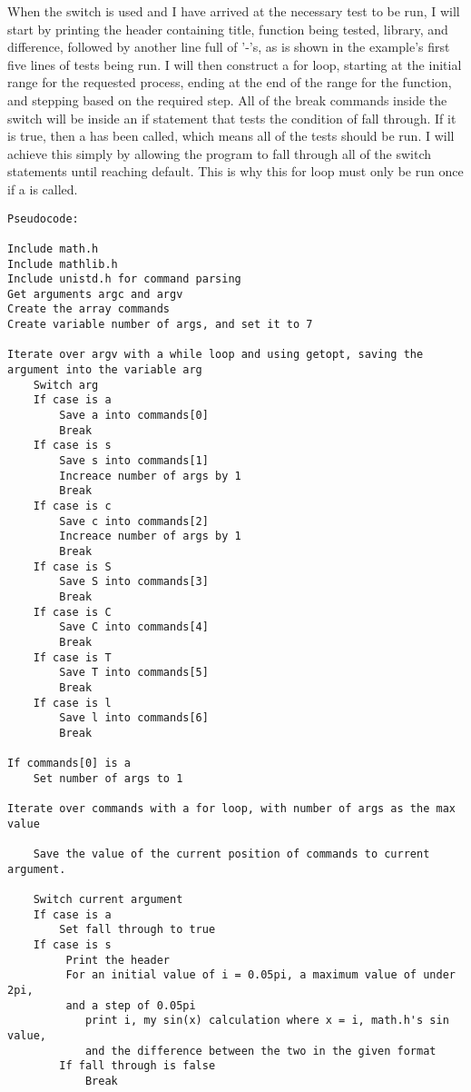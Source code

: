 \documentclass[11pt]{article}
\begin{document}
When the switch is used and I have arrived at the necessary test to be run, I will start by printing the header containing title, function being tested, library, and difference, followed by another line full of '-'s, as is shown in the example’s first five lines of tests being run. I will then construct a for loop, starting at the initial range for the requested process, ending at the end of the range for the function, and stepping based on the required step. All of the break commands inside the switch will be inside an if statement that tests the condition of fall through. If it is true, then a has been called, which means all of the tests should be run. I will achieve this simply by allowing the program to fall through all of the switch statements until reaching default. This is why this for loop must only be run once if a is called.
\begin{verbatim}
Pseudocode:

Include math.h
Include mathlib.h
Include unistd.h for command parsing
Get arguments argc and argv
Create the array commands
Create variable number of args, and set it to 7

Iterate over argv with a while loop and using getopt, saving the argument into the variable arg
    Switch arg
    If case is a
        Save a into commands[0]
        Break
    If case is s
        Save s into commands[1]
        Increace number of args by 1
        Break
    If case is c
        Save c into commands[2]
        Increace number of args by 1
        Break
    If case is S
        Save S into commands[3]
        Break
    If case is C
        Save C into commands[4]
        Break
    If case is T
        Save T into commands[5]
        Break
    If case is l
        Save l into commands[6]
        Break

If commands[0] is a
    Set number of args to 1

Iterate over commands with a for loop, with number of args as the max value

    Save the value of the current position of commands to current argument.

    Switch current argument
    If case is a
        Set fall through to true
    If case is s
         Print the header
         For an initial value of i = 0.05pi, a maximum value of under 2pi,
         and a step of 0.05pi
            print i, my sin(x) calculation where x = i, math.h's sin value,
            and the difference between the two in the given format
        If fall through is false
            Break


\end{verbatim}
\end{document}
